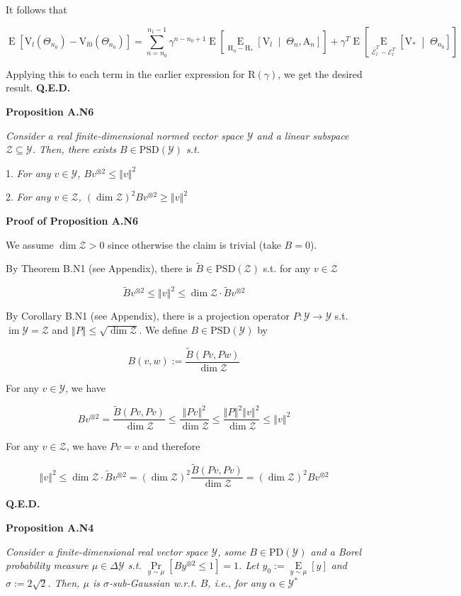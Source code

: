 \documentclass[a4paper]{article}
\newcommand{\Co}[1]{}
\newcommand{\AP}[1]{\left(#1\right)}
\newcommand{\AB}[1]{\left[#1\right]}
\newcommand{\ABM}[2]{\left[#1\;\middle\vert\;#2\right]}
\newcommand{\Pa}[2]{\underset{#1}{\operatorname{Pr}}\AB{#2}}
\newcommand{\Ea}[2]{\underset{#1}{\operatorname{E}}\AB{#2}}
\newcommand{\CE}[3]{\underset{#1}{\operatorname{E}}\ABM{#2}{#3}}
\newcommand{\PD}{\mathrm{PD}}
\newcommand{\PSD}{\mathrm{PSD}}
\DeclareMathOperator{\Img}{im}
\newcommand{\Norm}[1]{\left\Vert #1 \right\Vert}
\newcommand{\B}{B}
\newcommand{\Y}{\mathcal{Y}}
\newcommand{\Z}{\mathcal{Z}}
\newcommand{\V}{\mathrm{V}}
\newcommand{\Reg}{\mathrm{R}}
\newcommand{\AT}{\mathrm{A}}
\newcommand{\THy}{\mathrm{H}_*}
\newcommand{\SHy}{\mathrm{H}}
\newcommand{\Ev}{\mathcal{E}}
\begin{document}
It follows that

$$\Ea{}{\V_{l}\AP{\Theta_{n_0}}-\V_{l0}\AP{\Theta_{n_0}}}=\sum_{n=n_0}^{n_1-1}\gamma^{n-n_0+1}\Ea{}{\CE{\SHy_n-\THy}{\V_{l}}{\Theta_n,\AT_n}}+\gamma^T\Ea{}{\CE{\bar{\Ev}_l^T-\Ev_l^T}{\V_*}{\Theta_{n_0}}}$$

Applying this to each term in the earlier expression for $\Reg(\gamma)$, we get the desired result. \textbf{Q.E.D.}\Co{b}

\textbf{Proposition A.N6}\Co{b}

\textit{Consider a real finite-dimensional normed vector space $\Y$ and a linear subspace $\Z\subseteq \Y$. Then, there exists $\B \in\PSD(\Y)$ s.t.}\Co{i}

1. \textit{For any $v\in \Y$, $\B v^{\otimes 2}\leq\Norm{v}^2$}\Co{i}

2. \textit{For any $v\in \Z$, $\AP{\dim{\Z}}^2 \B v^{\otimes 2}\geq \Norm{v}^2$}\Co{i}

\textbf{Proof of Proposition A.N6}\Co{b}

We assume $\dim{\Z}>0$ since otherwise the claim is trivial (take $B=0$).

By Theorem B.N1 (see Appendix), there is $\tilde{B}\in\PSD(\Z)$ s.t. for any $v\in\Z$

$$\tilde{B}v^{\otimes2}\leq\Norm{v}^2\leq\dim{\Z}\cdot\tilde{B}v^{\otimes2}$$

By Corollary B.N1 (see Appendix), there is a projection operator $P:\Y\rightarrow\Y$ s.t. $\Img{\Y}=\Z$ and $\Norm{P}\leq\sqrt{\dim{\Z}}$. We define $B\in\PSD(\Y)$ by

$$B(v,w):=\frac{\tilde{B}\AP{Pv,Pw}}{\dim{\Z}}$$

For any $v\in\Y$, we have

$$Bv^{\otimes2}=\frac{\tilde{B}\AP{Pv,Pv}}{\dim{\Z}}\leq\frac{\Norm{Pv}^2}{\dim{\Z}}\leq\frac{\Norm{P}^2\Norm{v}^2}{\dim{\Z}}\leq\Norm{v}^2$$

For any $v\in\Z$, we have $Pv=v$ and therefore

$$\Norm{v}^2\leq\dim{\Z}\cdot\tilde{B}v^{\otimes2}=\AP{\dim{\Z}}^2\frac{\tilde{B}(Pv,Pv)}{\dim{\Z}}=\AP{\dim{\Z}}^2Bv^{\otimes2}$$
 
\textbf{Q.E.D.}\Co{b}

\textbf{Proposition A.N4}\Co{b}

\textit{Consider a finite-dimensional real vector space $\Y$, some $\B \in\PD(\Y)$ and a Borel probability measure $\mu\in\Delta\Y$ s.t. $\Pa{y\sim\mu}{\B y^{\otimes 2} \leq 1} = 1$. Let $y_0:=\Ea{y\sim\mu}{y}$ and $\sigma:=2\sqrt{2}$. Then, $\mu$ is $\sigma$-sub-Gaussian w.r.t. $\B $, i.e., for any $\alpha\in\Y^*$}\Co{i}
\end{document}
